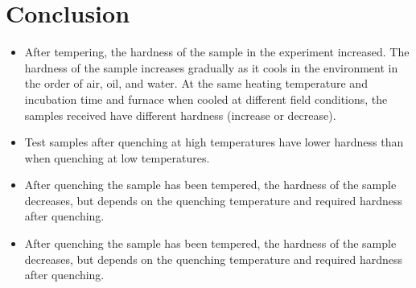 \section{Conclusion}
\begin{itemize}
	\item After tempering, the hardness of the sample in the experiment increased. The hardness of the sample increases gradually as it cools in the environment in the order of air, oil, and water. At the same heating temperature and incubation time and furnace when cooled at different field conditions, the samples received have different hardness (increase or decrease).
	\item Test samples after quenching at high temperatures have lower hardness than when quenching at low temperatures.
	\item After quenching the sample has been tempered, the hardness of the sample decreases, but depends on the quenching temperature and required hardness after quenching.
	\item After quenching the sample has been tempered, the hardness of the sample decreases, but depends on the quenching temperature and required hardness after quenching.
\end{itemize}